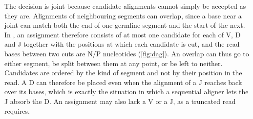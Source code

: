 \documentclass[11pt,a4paper]{article}
\begin{document}
The decision is joint because candidate alignments cannot simply be accepted
as they are. Alignments of neighbouring segments can overlap, since a base
near a joint can match both the end of one germline segment and the start of
the next. In \swig{}, an assignment therefore consists of at most
one candidate for each of V, D and J together with the positions at which
each candidate is cut, and the read bases between two cuts are N/P
nucleotides (\cref{fig:dag}). An overlap can thus go to either segment, be
split between them at any point, or be left to neither. Candidates are
ordered by the kind of segment and not by their position in the read. A D
can therefore be placed even when the alignment of a J reaches back over its
bases, which is exactly the situation in which a sequential aligner lets the
J absorb the D. An assignment may also lack a V or a J, as a truncated read
requires.
\end{document}
